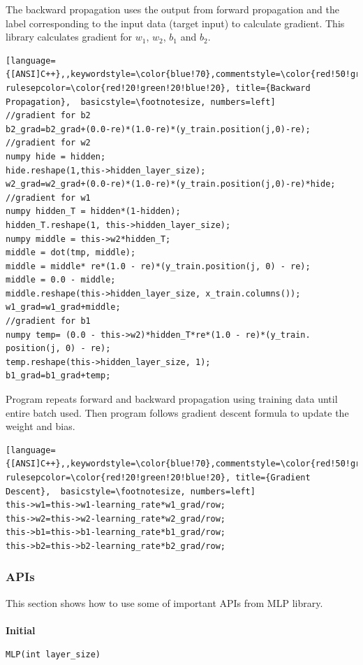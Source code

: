 \documentclass[a4paper]{article}
\begin{document}
The backward propagation uses the output from forward propagation and the label corresponding to the input data (target input) to calculate gradient. This library calculates gradient for $w_{1}$, $w_{2}$, $b_{1}$ and $b_{2}$.
\begin{lstlisting}[language={[ANSI]C++},,keywordstyle=\color{blue!70},commentstyle=\color{red!50!green!50!blue!50},frame=shadowbox, rulesepcolor=\color{red!20!green!20!blue!20}, title={Backward Propagation},  basicstyle=\footnotesize, numbers=left]  
//gradient for b2
b2_grad=b2_grad+(0.0-re)*(1.0-re)*(y_train.position(j,0)-re);
//gradient for w2		
numpy hide = hidden;
hide.reshape(1,this->hidden_layer_size);
w2_grad=w2_grad+(0.0-re)*(1.0-re)*(y_train.position(j,0)-re)*hide;
//gradient for w1		
numpy hidden_T = hidden*(1-hidden);
hidden_T.reshape(1, this->hidden_layer_size);
numpy middle = this->w2*hidden_T;
middle = dot(tmp, middle);
middle = middle* re*(1.0 - re)*(y_train.position(j, 0) - re);
middle = 0.0 - middle;
middle.reshape(this->hidden_layer_size, x_train.columns());
w1_grad=w1_grad+middle;
//gradient for b1
numpy temp= (0.0 - this->w2)*hidden_T*re*(1.0 - re)*(y_train.
position(j, 0) - re);
temp.reshape(this->hidden_layer_size, 1);
b1_grad=b1_grad+temp;
\end{lstlisting}

Program repeats forward and backward propagation using training data until entire batch used. Then program follows gradient descent formula to update the weight and bias.
\begin{lstlisting}[language={[ANSI]C++},,keywordstyle=\color{blue!70},commentstyle=\color{red!50!green!50!blue!50},frame=shadowbox, rulesepcolor=\color{red!20!green!20!blue!20}, title={Gradient Descent},  basicstyle=\footnotesize, numbers=left]  
this->w1=this->w1-learning_rate*w1_grad/row;
this->w2=this->w2-learning_rate*w2_grad/row;
this->b1=this->b1-learning_rate*b1_grad/row;
this->b2=this->b2-learning_rate*b2_grad/row;
\end{lstlisting}

\subsubsection{APIs}
This section shows how to use some of important APIs from MLP library.\\\\
\textbf{\Large Initial}
\begin{lstlisting}[language={[ANSI]C++},keywordstyle=\color{blue!70},commentstyle=\color{red!50!green!50!blue!50},frame=shadowbox, rulesepcolor=\color{red!20!green!20!blue!20}]
MLP(int layer_size)
\end{lstlisting}
\end{document}
